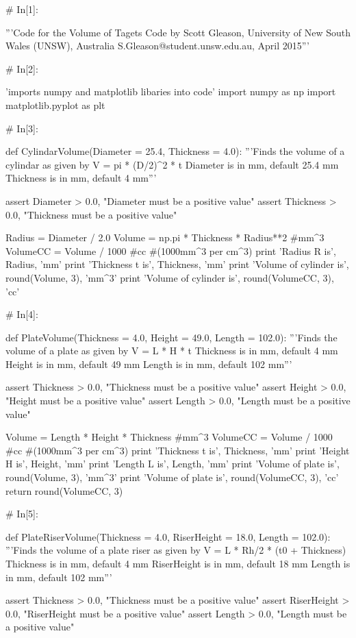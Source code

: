 \documentclass[a4paper,8pt]{article}
\begin{document}
\begin{python}
# In[1]:

'''Code for the Volume of Tagets
Code by Scott Gleason, University of New South Wales (UNSW), Australia 
S.Gleason@student.unsw.edu.au, April 2015'''


# In[2]:

'imports numpy and matplotlib libaries into code'
import numpy as np
import matplotlib.pyplot as plt


# In[3]:

def CylindarVolume(Diameter = 25.4, Thickness = 4.0):
'''Finds the volume of a cylindar as given by 
V = pi * (D/2)^2 * t
Diameter is in mm, default 25.4 mm
Thickness is in mm, default 4 mm'''

assert Diameter > 0.0, "Diameter must be a positive value"
assert Thickness > 0.0, "Thickness must be a positive value"

Radius = Diameter / 2.0
Volume = np.pi * Thickness * Radius**2 #mm^3
VolumeCC = Volume / 1000 #cc #(1000mm^3 per cm^3)
print 'Radius R is', Radius, 'mm'
print 'Thickness t is', Thickness, 'mm'
print 'Volume of cylinder is', round(Volume, 3), 'mm^3'
print 'Volume of cylinder is', round(VolumeCC, 3), 'cc'


# In[4]:

def PlateVolume(Thickness = 4.0, Height = 49.0, Length = 102.0):
'''Finds the volume of a plate as given by 
V = L * H * t
Thickness is in mm, default 4 mm
Height is in mm, default 49 mm
Length is in mm, default 102 mm'''

assert Thickness > 0.0, "Thickness must be a positive value"
assert Height > 0.0, "Height must be a positive value"
assert Length > 0.0, "Length must be a positive value"

Volume = Length * Height * Thickness #mm^3
VolumeCC = Volume / 1000 #cc #(1000mm^3 per cm^3)
print 'Thickness t is', Thickness, 'mm'
print 'Height H is', Height, 'mm'
print 'Length L is', Length, 'mm'
print 'Volume of plate is', round(Volume, 3), 'mm^3'
print 'Volume of plate is', round(VolumeCC, 3), 'cc'
return round(VolumeCC, 3)


# In[5]:

def PlateRiserVolume(Thickness = 4.0, RiserHeight = 18.0, Length = 102.0):
'''Finds the volume of a plate riser as given by 
V = L * Rh/2 * (t0 + Thickness)
Thickness is in mm, default 4 mm
RiserHeight is in mm, default 18 mm
Length is in mm, default 102 mm'''

assert Thickness > 0.0, "Thickness must be a positive value"
assert RiserHeight > 0.0, "RiserHeight must be a positive value"
assert Length > 0.0, "Length must be a positive value"


\end{python}
\end{document}
